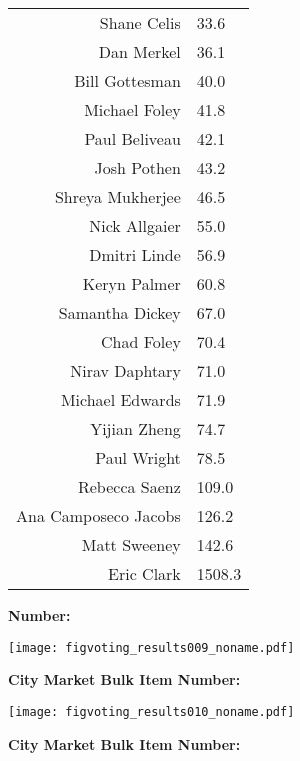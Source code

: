 \begin{frame}[plain]
\begin{frame}[plain]
\begin{frame}[plain]
\begin{frame}[plain]
\begin{frame}[plain]
\begin{frame}[plain]
\begin{frame}[plain]
\begin{frame}[plain]
\begin{frame}[plain]
\begin{frame}[plain]
\begin{frame}[plain]
\begin{frame}[plain]
\begin{frame}[plain]
\begin{frame}[plain]
\begin{frame}[plain]
\begin{frame}[plain]
\begin{frame}[plain]
\begin{frame}[plain]
\begin{frame}[plain]
\begin{frame}[plain]
\begin{frame}[plain]
\begin{frame}[plain]
\begin{frame}[plain]
\begin{frame}[plain]
\begin{frame}[plain]
\begin{frame}[plain]
\begin{frame}[plain]
\begin{frame}[plain]
  \begin{tabular}{rl}
    Shane Celis & 33.6 \\ 
    Dan Merkel & 36.1 \\ 
    Bill Gottesman & 40.0 \\ 
    Michael Foley & 41.8 \\ 
    Paul Beliveau & 42.1 \\ 
    Josh Pothen & 43.2 \\ 
    Shreya Mukherjee & 46.5 \\ 
    Nick Allgaier & 55.0 \\ 
    Dmitri Linde & 56.9 \\ 
    Keryn Palmer & 60.8 \\ 
    Samantha Dickey & 67.0 \\ 
    Chad Foley & 70.4 \\ 
    Nirav Daphtary & 71.0 \\ 
    Michael Edwards & 71.9 \\ 
    Yijian Zheng & 74.7 \\ 
    Paul Wright & 78.5 \\ 
    Rebecca Saenz & 109.0 \\ 
    Ana Camposeco Jacobs & 126.2 \\ 
    Matt Sweeney & 142.6 \\ 
    Eric Clark & 1508.3 \\ 
  \end{tabular}
  


  \textbf{Number:}

  \begin{center}
    \texttt{[image: figvoting\_results009\_noname.pdf]}    
  \end{center}


  \textbf{City Market Bulk Item Number:}

  \begin{center}
    \texttt{[image: figvoting\_results010\_noname.pdf]}    
  \end{center}


  \textbf{City Market Bulk Item Number:}


\end{frame}
\end{frame}
\end{frame}
\end{frame}
\end{frame}
\end{frame}
\end{frame}
\end{frame}
\end{frame}
\end{frame}
\end{frame}
\end{frame}
\end{frame}
\end{frame}
\end{frame}
\end{frame}
\end{frame}
\end{frame}
\end{frame}
\end{frame}
\end{frame}
\end{frame}
\end{frame}
\end{frame}
\end{frame}
\end{frame}
\end{frame}
\end{frame}
